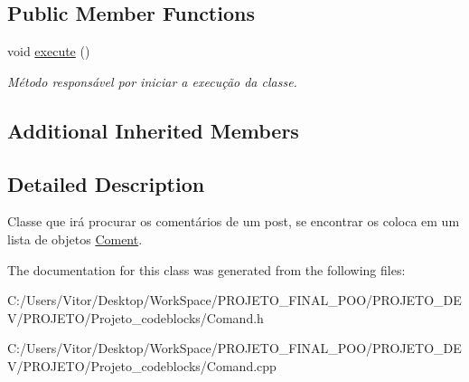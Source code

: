 \subsection*{Public Member Functions}
\begin{DoxyCompactItemize}
\item 
\hypertarget{class_command_find_post_coments_a9e9fdb81a5355d61e93e803adbcf5257}{void \hyperlink{class_command_find_post_coments_a9e9fdb81a5355d61e93e803adbcf5257}{execute} ()}\label{class_command_find_post_coments_a9e9fdb81a5355d61e93e803adbcf5257}

\begin{DoxyCompactList}\small\item\em Método responsável por iniciar a execução da classe. \end{DoxyCompactList}\end{DoxyCompactItemize}
\subsection*{Additional Inherited Members}


\subsection{Detailed Description}
Classe que irá procurar os comentários de um post, se encontrar os coloca em um lista de objetos \hyperlink{class_coment}{Coment}. 

The documentation for this class was generated from the following files\-:\begin{DoxyCompactItemize}
\item 
C\-:/\-Users/\-Vitor/\-Desktop/\-Work\-Space/\-P\-R\-O\-J\-E\-T\-O\-\_\-\-F\-I\-N\-A\-L\-\_\-\-P\-O\-O/\-P\-R\-O\-J\-E\-T\-O\-\_\-\-D\-E\-V/\-P\-R\-O\-J\-E\-T\-O/\-Projeto\-\_\-codeblocks/Comand.\-h\item 
C\-:/\-Users/\-Vitor/\-Desktop/\-Work\-Space/\-P\-R\-O\-J\-E\-T\-O\-\_\-\-F\-I\-N\-A\-L\-\_\-\-P\-O\-O/\-P\-R\-O\-J\-E\-T\-O\-\_\-\-D\-E\-V/\-P\-R\-O\-J\-E\-T\-O/\-Projeto\-\_\-codeblocks/Comand.\-cpp\end{DoxyCompactItemize}
